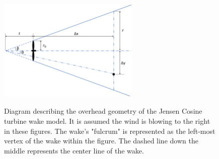 \documentclass[a4paper]{jpconf}
\begin{document}


\begin{figure}[h]
	\centering
	\includegraphics[width=0.6\textwidth]{JensenDiagramNew}
	\label{fig:JensenDiagrams}
	\caption{Diagram describing the overhead geometry of the Jensen Cosine turbine wake model. It is assumed the wind is blowing to the right in these figures. The wake's "fulcrum" is represented as the left-most vertex of the wake within the figure. The dashed line down the middle represents the center line of the wake.}
\end{figure}
\end{document}
